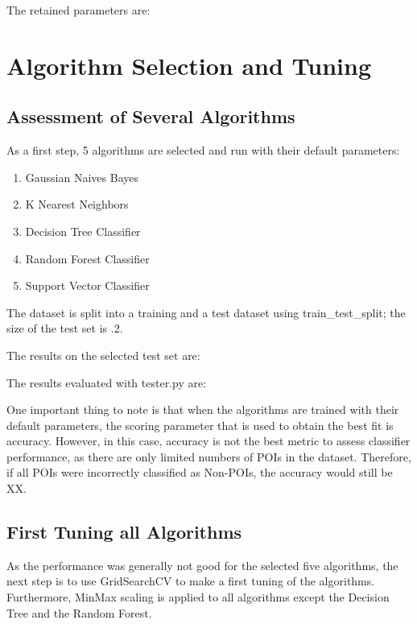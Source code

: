 \documentclass[11pt]{article} %
\begin{document}
The retained parameters are:

{}

\section{Algorithm Selection and Tuning}

\subsection{Assessment of Several Algorithms}
As a first step, 5 algorithms are selected and run with their default parameters:
\begin{enumerate}
\item Gaussian Naives Bayes
\item K Nearest Neighbors
\item Decision Tree Classifier
\item Random Forest Classifier
\item Support Vector Classifier
\end{enumerate}

The dataset is split into a training and a test dataset using {\selectfont train\_test\_split}; the size of the test set is .2.\medskip

The results on the selected test set are:

The results evaluated with tester.py are:

One important thing to note is that when the algorithms are trained with their default parameters, the scoring parameter that is used to obtain the best fit is accuracy. However, in this case, accuracy is not the best metric to assess classifier performance, as there are only limited numbers of POIs in the dataset. Therefore, if all POIs were incorrectly classified as Non-POIs, the accuracy would still be XX.

\subsection{First Tuning all Algorithms}
As the performance was generally not good for the selected five algorithms, the next step is to use {\selectfont GridSearchCV} to make a first tuning of the algorithms. Furthermore, MinMax scaling is applied to all algorithms except the Decision Tree and the Random Forest.\medskip
\end{document}
